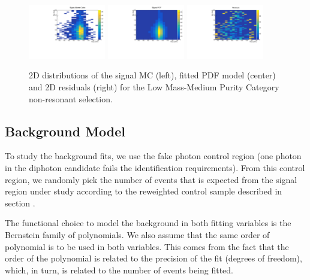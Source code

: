 \begin{figure}[thb]
  \centering
\includegraphics[width=0.3\textwidth]{figures/sec-signals/SignalResiduals/h_mc_LM_cat1}\hfil
\includegraphics[width=0.3\textwidth]{figures/sec-signals/SignalResiduals/h_pd_LM_cat1}\hfil
\includegraphics[width=0.3\textwidth]{figures/sec-signals/SignalResiduals/h_re_LM_cat1}\hfil
  \caption{2D distributions of the signal MC (left), fitted PDF model (center) and 2D residuals (right) for the Low Mass-Medium Purity Category non-resonant selection.}
  \label{fig:sig_resi_lm_mpc}
\end{figure}



\subsection{Background Model}

To study the background fits, we use the fake photon control region (one photon in the diphoton candidate fails the identification requirements). From this control region, we randomly pick the number of events that is expected from the signal region under study according to the reweighted control sample described in section \label{sec:cats}.

The functional choice to model the background in both fitting variables is the Bernstein family of polynomials. 
We also assume that the same order of polynomial is to be used in both variables. 
This comes from the fact that the order of the polynomial is related to the precision of the fit (degrees of freedom), which, in turn, is related to the number of events being fitted. 

